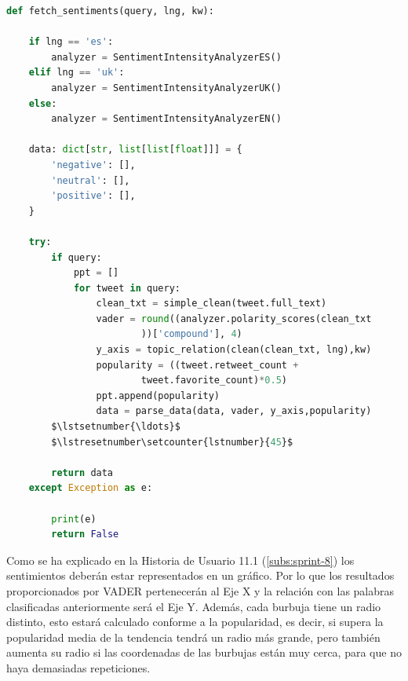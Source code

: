 \vspace{0.3cm}

\begin{lstlisting}[caption=Extracción de los sentimientos,          label={lst:listing-python},language=Python, mathescape=true]
def fetch_sentiments(query, lng, kw):

    if lng == 'es':
        analyzer = SentimentIntensityAnalyzerES()
    elif lng == 'uk':
        analyzer = SentimentIntensityAnalyzerUK()
    else:
        analyzer = SentimentIntensityAnalyzerEN()

    data: dict[str, list[list[float]]] = {
        'negative': [],
        'neutral': [],
        'positive': [],
    }

    try:
        if query:
            ppt = []
            for tweet in query:
                clean_txt = simple_clean(tweet.full_text)
                vader = round((analyzer.polarity_scores(clean_txt
                        ))['compound'], 4)
                y_axis = topic_relation(clean(clean_txt, lng),kw)
                popularity = ((tweet.retweet_count + 
                        tweet.favorite_count)*0.5)
                ppt.append(popularity)
                data = parse_data(data, vader, y_axis,popularity)
        $\lstsetnumber{\ldots}$
        $\lstresetnumber\setcounter{lstnumber}{45}$
        
        return data
    except Exception as e:

        print(e)
        return False
\end{lstlisting}

Como se ha explicado en la Historia de Usuario 11.1 (\ref{subs:sprint-8}) los sentimientos deberán estar representados en un gráfico. Por lo que los resultados proporcionados por \ac{VADER} pertenecerán al Eje X y la relación con las palabras clasificadas anteriormente será el Eje Y. Además, cada burbuja tiene un radio distinto, esto estará calculado conforme a la popularidad, es decir, si supera la popularidad media de la tendencia tendrá un radio más grande, pero también aumenta su radio si las coordenadas de las burbujas están muy cerca, para que no haya demasiadas repeticiones.

\vspace{0.3cm}

